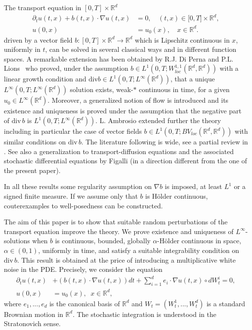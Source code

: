 \documentclass[a4paper,10pt]{article}
\begin{document}
The transport equation in $[0,T]\times\mathbb{R}^{d}$%
\begin{align*}
\partial_{t}u(t,x)+b(t,x)\cdot\nabla u(t,x)  &  =0,\quad(t,x)\in
\lbrack0,T]\times\mathbb{R}^{d},\\
u(0,x)  &  =u_{0}(x),\quad x\in\mathbb{R}^{d}.
\end{align*}
driven by a vector field $b:[0,T]\times\mathbb{R}^{d}\rightarrow\mathbb{R}%
^{d}$ which is Lipschitz continuous in $x$, uniformly in $t$, can
be solved in several classical ways and in different function
spaces. A remarkable extension has been obtained by R.J. Di Perna
and P.L. Lions~\cite{DiPernaLions} who proved, under the
assumption $b\in L^{1}( 0,T;W_{loc}^{1,1}(
\mathbb{R}^{d},\mathbb{R}^{d}))  $ with a linear growth condition
and ${\mathrm{div}} b \in L^1(0, T; L^{\infty}(\mathbb {R}^d))$,
that a unique
 $L^{\infty}( 0,T;L^{\infty }( \mathbb{R}^{d}) ) $ solution exists,
weak-$*$
continuous in time, for a given $u_{0}\in L^{\infty}(  \mathbb{R}%
^{d})  $. Moreover, a generalized notion of flow is introduced and its
existence and uniqueness is proved under the assumption that the negative part
of ${\mathrm{div}\,}b$ is $L^{1}(  0,T;L^{\infty}(  \mathbb{R}%
^{d}) )  $. L. Ambrosio \cite{Ambrosio} extended further the
theory including in particular the case of vector fields $b\in L^{1}(
0,T;BV_{loc}(  \mathbb{R}^{d},\mathbb{R}^{d}) )  $ with
similar conditions on ${\mathrm{div}\,}b$. The literature following
\cite{DiPernaLions} is wide, see a partial review in \cite{AmbrCrippa}. See
also a generalization to transport-diffusion equations and the associated
stochastic differential equations by Figalli \cite{Figalli} (in a direction
different from the one of the present paper).

In all these results some regularity assumption on $\nabla b$ is
imposed, at least $L^{1}$ or a signed finite measure. If we assume
only that $b$ is H\"{o}lder continuous, couterexamples to
 well-posedness can be constructed.

The aim of this paper is to show that suitable random
perturbations of the transport equation improve the theory. We
prove existence and uniqueness of
$L^{\infty}$-solutions when $b$ is continuous, bounded, globally ${\alpha}%
$-H\"{o}lder continuous in space, ${\alpha}\in(0,1)$, uniformly in
time, and satisfy a suitable  integrability condition on
${\mathrm{div}\,}b$. This result is obtained at the price of
introducing a multiplicative white noise in the PDE. Precisely, we
consider the equation
\begin{equation}
\begin{aligned}
 \partial_{t}u(  t,x)  &+(  b(  t,x)  \cdot\nabla
u(  t,x) )  dt+\sum_{i=1}^{d}e_{i}\cdot\nabla u( t,x)  \circ
dW_{t}^{i}=0,\\  u(  0,x) & =u_{0}( x),\;\; x \in \mathbb{R}^d,
\end{aligned}
\label{SPDE}%
\end{equation}
where $e_{1},...,e_{d}$ is the canonical basis of ${\mathbb{R}}^{d}$ and
$W_{t}=(W_{t}^{1},...,W_{t}^{d})$ is a standard Brownian motion in
${\mathbb{R}}^{d}$. The stochastic integration is understood in the
Stratonovich sense.
\end{document}
